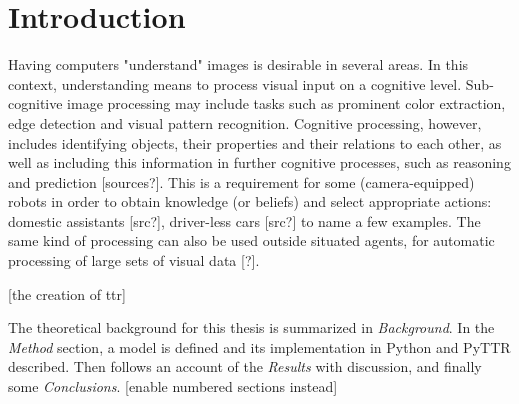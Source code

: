 \documentclass[11pt, a4paper]{article}
\begin{document}
\thispagestyle{empty}




\newpage

\begin{spacing}{0.0}
\glsresetall
\tableofcontents
\end{spacing}

\thispagestyle{empty}

\newpage
\setcounter{page}{1}

\glsresetall
\section{Introduction}
\label{sec:intro}

Having computers "understand" images is desirable in several areas.
In this context, understanding means to process visual input on a cognitive level.
Sub-cognitive image processing may include tasks such as prominent color extraction, edge detection and visual pattern recognition.
Cognitive processing, however, includes identifying objects, their properties and their relations to each other, as well as including this information in further cognitive processes, such as reasoning and prediction [sources?].
This is a requirement for some (camera-equipped) robots in order to obtain knowledge (or beliefs) and select appropriate actions: domestic assistants [src?], driver-less cars [src?] to name a few examples.
The same kind of processing can also be used outside situated agents, for automatic processing of large sets of visual data [?].

[the creation of ttr]

The theoretical background for this thesis is summarized in \textit{Background}.
In the \textit{Method} section, a model is defined and its implementation in Python and PyTTR described.
Then follows an account of the \textit{Results} with discussion, and finally some \textit{Conclusions}.
[enable numbered sections instead]
\end{document}
